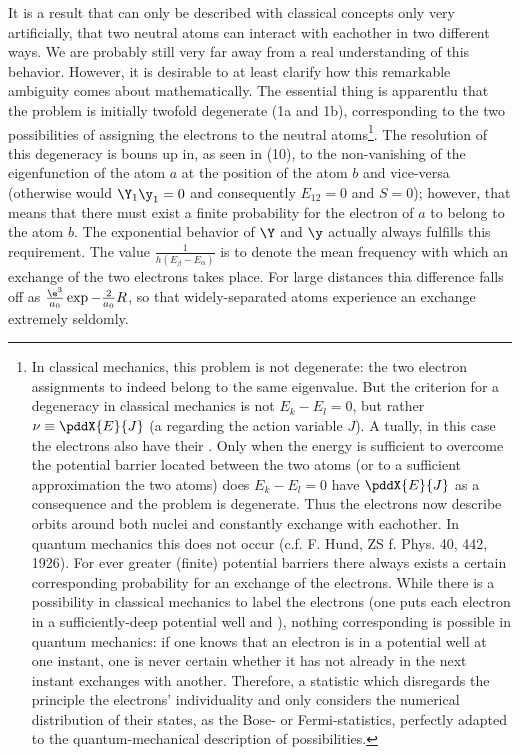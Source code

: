 \documentclass{article}
\begin{document}
It is a result that can only be described with classical concepts only very artificially, that two neutral atoms can interact with eachother in two different ways. We are probably still very far away from a real understanding of this behavior. However, it is desirable to at least clarify how this remarkable ambiguity comes about mathematically. The essential thing is apparentlu that the problem is initially twofold degenerate (1a and 1b), corresponding to the two possibilities of assigning the electrons to the neutral atoms\footnote{In classical mechanics, this problem is not degenerate: the two electron assignments to indeed belong to the same eigenvalue. But the criterion for a degeneracy in classical mechanics is not $E_k - E_l = 0$, but rather $\nu \equiv \pddX{E}{J}$ (a  regarding the action variable $J$). A tually, in this case the electrons also have their . Only when the energy is sufficient to overcome the potential barrier located between the two atoms (or to a sufficient approximation the two atoms) does $E_k-E_l=0$ have $\pddX{E}{J}$ as a consequence and the problem is degenerate. Thus the electrons now describe orbits around both nuclei and constantly exchange with eachother. In quantum mechanics this  does not occur (c.f. F. Hund, ZS f. Phys. 40, 442, 1926). For ever greater (finite) potential barriers there always exists a certain corresponding probability for an exchange of the electrons. While there is a possibility in classical mechanics to label the electrons (one puts each electron in a sufficiently-deep potential well and ), nothing corresponding is possible in quantum mechanics: if one knows that an electron is in a potential well at one instant, one is never certain whether it has not already in the next instant exchanges with another. Therefore, a statistic which disregards the principle the electrons' individuality and only considers the numerical distribution of their states, as the Bose- or Fermi-statistics, perfectly adapted to the quantum-mechanical description of possibilities.}. The resolution of this degeneracy is bouns up in, as seen in (10), to the non-vanishing of the eigenfunction of the atom $a$ at the position of the atom $b$ and vice-versa (otherwise would $\Y_1\y_1=0$ and consequently $E_{12}=0$ and $S=0$); however, that means that there must exist a finite probability for the electron of $a$ to belong to the atom $b$. The exponential behavior of $\Y$ and $\y$ actually always fulfills this requirement. The value $\frac{1}{h(E_\beta - E_\alpha)}$ is to denote the mean frequency with which an exchange of the two electrons takes place. For large distances thia difference falls off as $\frac{\e^3}{a_0}\exp{-\frac{2}{a_0}R}$, so that widely-separated atoms experience an exchange extremely seldomly.
 
\end{document}
